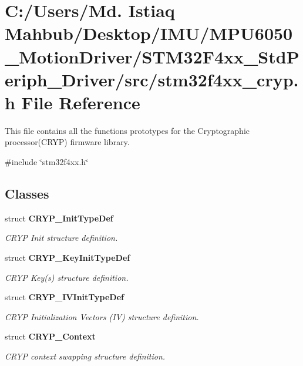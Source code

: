 \section{C\+:/\+Users/\+Md. Istiaq Mahbub/\+Desktop/\+I\+M\+U/\+M\+P\+U6050\+\_\+\+Motion\+Driver/\+S\+T\+M32\+F4xx\+\_\+\+Std\+Periph\+\_\+\+Driver/src/stm32f4xx\+\_\+cryp.h File Reference}
\label{stm32f4xx__cryp_8h}


This file contains all the functions prototypes for the Cryptographic processor(\+C\+R\+Y\+P) firmware library.  


{\ttfamily \#include \char`\"{}stm32f4xx.\+h\char`\"{}}\newline
\subsection*{Classes}
\begin{DoxyCompactItemize}
\item 
struct \textbf{ C\+R\+Y\+P\+\_\+\+Init\+Type\+Def}
\begin{DoxyCompactList}\small\item\em C\+R\+YP Init structure definition. \end{DoxyCompactList}\item 
struct \textbf{ C\+R\+Y\+P\+\_\+\+Key\+Init\+Type\+Def}
\begin{DoxyCompactList}\small\item\em C\+R\+YP Key(s) structure definition. \end{DoxyCompactList}\item 
struct \textbf{ C\+R\+Y\+P\+\_\+\+I\+V\+Init\+Type\+Def}
\begin{DoxyCompactList}\small\item\em C\+R\+YP Initialization Vectors (IV) structure definition. \end{DoxyCompactList}\item 
struct \textbf{ C\+R\+Y\+P\+\_\+\+Context}
\begin{DoxyCompactList}\small\item\em C\+R\+YP context swapping structure definition. \end{DoxyCompactList}\end{DoxyCompactItemize}
